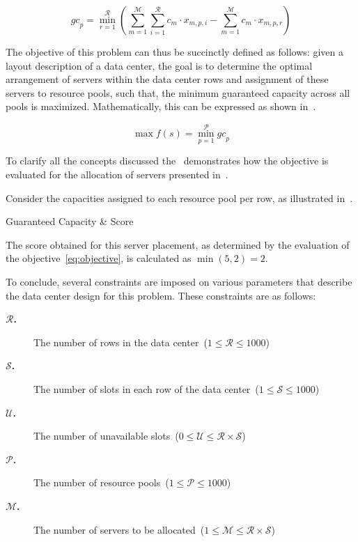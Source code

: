 \begin{equation}
  \label{eq:guaranteed-capacity}
  {gc}_{p} = \min_{r = 1}^{\mathcal{R}} \left({\sum_{m = 1}^{\mathcal{M}}{\sum_{i = 1}^{\mathcal{R}} c_{m} \cdot x_{m,p,i}}} - {\sum_{m = 1}^{\mathcal{M}} c_{m} \cdot x_{m,p,r}}\right)
\end{equation}

The objective of this problem can thus be succinctly defined as follows: given a
layout description of a data center, the goal is to determine the optimal
arrangement of servers within the data center rows and assignment of these
servers to resource pools, such that, the minimum guaranteed capacity across all
pools is maximized. Mathematically, this can be expressed as shown
in~.

\begin{equation}
  \label{eq:objective}
  \max{f(s)} = \min_{p = 1}^{\mathcal{P}}{{gc}_{p}}
\end{equation}

To clarify all the concepts discussed the~ demonstrates
how the objective is evaluated for the allocation of servers presented
in~.

\begin{example}
  \label{ex:problem-scoring}
  Consider the capacities assigned to each resource pool per row, as illustrated
  in~.

  \begin{table}[ht]
    \centering
    
    \caption{Guaranteed Capacity \& Score}
    \label{tab:dc-gc-example}
  \end{table}

  The score obtained for this server placement, as determined by the evaluation
  of the objective~\ref{eq:objective}, is calculated as $\min(5, 2) = 2$.
\end{example}

To conclude, several constraints are imposed on various parameters that
describe the data center design for this problem. These constraints are as
follows:

\begin{description}
  \item[\textbf{$\mathcal{R}$.}] The number of rows in the data center~($ 1 \leq \mathcal{R} \leq 1000$)
  \item[\textbf{$\mathcal{S}$.}] The number of slots in each row of the data center~($ 1 \leq \mathcal{S} \leq 1000$)
  \item[\textbf{$\mathcal{U}$.}] The number of unavailable slots~($ 0 \leq \mathcal{U} \leq \mathcal{R} \times \mathcal{S}$)
  \item[\textbf{$\mathcal{P}$.}] The number of resource pools~($ 1 \leq \mathcal{P} \leq 1000$)
  \item[\textbf{$\mathcal{M}$.}] The number of servers to be allocated~($ 1 \leq \mathcal{M} \leq \mathcal{R} \times \mathcal{S}$)
\end{description}